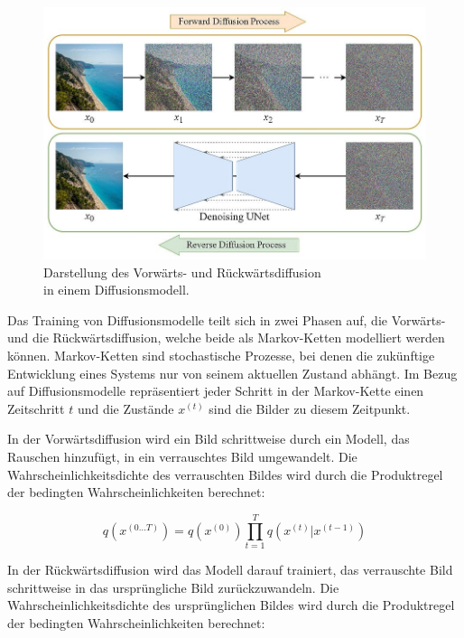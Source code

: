 \begin{figure}[h]
	\centering
	\includegraphics[width=12cm]{figure_stable-diffusion_image.jpg}
	\caption{Darstellung des Vorwärts- und Rückwärtsdiffusion\\in einem Diffusionsmodell.}
	\label{fig:regular-diffusion}
\end{figure}

Das Training von Diffusionsmodelle teilt sich in zwei Phasen auf, die Vorwärts- und die Rückwärtsdiffusion, welche beide als Markov-Ketten modelliert werden können. Markov-Ketten sind stochastische Prozesse, bei denen die zukünftige Entwicklung eines Systems nur von seinem aktuellen Zustand abhängt. Im Bezug auf Diffusionsmodelle repräsentiert jeder Schritt in der Markov-Kette einen Zeitschritt $t$ und die Zustände $x^{(t)}$ sind die Bilder zu diesem Zeitpunkt.

In der Vorwärtsdiffusion wird ein Bild schrittweise durch ein Modell, das Rauschen hinzufügt, in ein verrauschtes Bild umgewandelt. Die Wahrscheinlichkeitsdichte des verrauschten Bildes wird durch die Produktregel der bedingten Wahrscheinlichkeiten berechnet:

\begin{equation}
	q \left( x^{(0 \dots T)} \right) = q \left(x^{(0)}\right)\prod_{t=1}^T q \left(x^{(t)}|x^{(t-1)}\right)
	\label{eq:forward-diffusion}
\end{equation}

In der Rückwärtsdiffusion wird das Modell darauf trainiert, das verrauschte Bild schrittweise in das ursprüngliche Bild zurückzuwandeln. Die Wahrscheinlichkeitsdichte des ursprünglichen Bildes wird durch die Produktregel der bedingten Wahrscheinlichkeiten berechnet:

